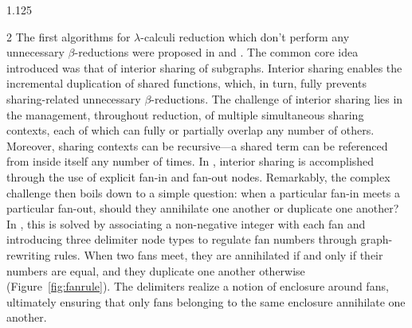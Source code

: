 \documentclass[10pt]{article}
\newcommand{\fan}[4]{
  \begin{scope}[shift={(#2)}, yscale={#3}]
    \coordinate (#1-left) at (-0.7,0.4);
    \coordinate (#1-right) at (0.7,0.4);
    \coordinate (#1-tip) at (0,-0.8);
    \ifthenelse{\equal{#4}{true}}{
      \draw[line width=1.4pt]  (-1,0.4) -- (1,0.4) -- (0,-0.8) -- cycle;
    }{false};
  \end{scope}
}
\begin{document}
\begin{spacing}{1.125}
\begin{multicols}{2}
The first algorithms for \mbox{$\lambda$-calculi} reduction which don't perform any unnecessary \mbox{$\beta$-reductions} were proposed in \cite{Lam89} and \cite{Kat90}. The common core idea introduced was that of interior sharing of subgraphs. Interior sharing enables the incremental duplication of shared functions, which, in turn, fully prevents sharing-related unnecessary \mbox{$\beta$-reductions}. The challenge of interior sharing lies in the management, throughout reduction, of multiple simultaneous sharing contexts, each of which can fully or partially overlap any number of others. Moreover, sharing contexts can be recursive---a shared term can be referenced from inside itself any number of times. In \cite{Lam89}, interior sharing is accomplished through the use of explicit fan-in and fan-out nodes. Remarkably, the complex challenge then boils down to a simple question: when a particular fan-in meets a particular fan-out, should they annihilate one another or duplicate one another? In \cite{Lam89}, this is solved by associating a non-negative integer with each fan and introducing three delimiter node types to regulate fan numbers through graph-rewriting rules. When two fans meet, they are annihilated if and only if their numbers are equal, and they duplicate one another otherwise (\mbox{Figure \ref{fig:fanrule}}). The delimiters realize a notion of enclosure around fans, ultimately ensuring that only fans belonging to the same enclosure annihilate one another.

\begin{figure}[H]
  \centering
\end{figure}
\end{multicols}
\end{spacing}
\end{document}
